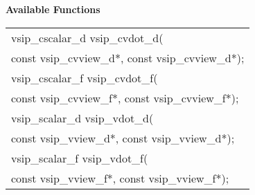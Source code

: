 \\\cvsiplh
\\ \hspace*{.8cm} \vspace*{.1cm} \textbf{Available Functions }
\\ \hspace*{1.1cm} {
\ttfamily
\begin{tabular}[H]{l}
vsip\_cscalar\_d vsip\_cvdot\_d(\\*\hspace{.6cm}const vsip\_cvview\_d*, const vsip\_cvview\_d*);\\
vsip\_cscalar\_f vsip\_cvdot\_f(\\*\hspace{.6cm}const vsip\_cvview\_f*, const vsip\_cvview\_f*);\\
vsip\_scalar\_d vsip\_vdot\_d(\\*\hspace{.6cm}const vsip\_vview\_d*, const vsip\_vview\_d*);\\
vsip\_scalar\_f vsip\_vdot\_f(\\*\hspace{.6cm}const vsip\_vview\_f*, const vsip\_vview\_f*);\\
\end{tabular}
}
\\\pyjvsiph
